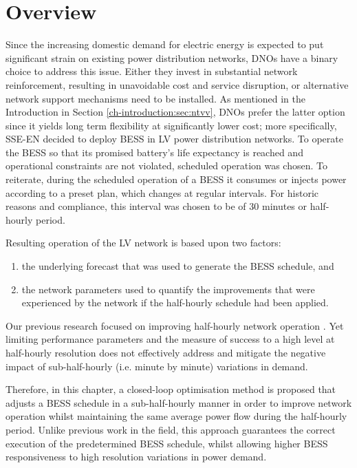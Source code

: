 \section{Overview}
\label{ch1:sec:overview}

Since the increasing domestic demand for electric energy is expected to put significant strain on existing power distribution networks, DNOs have a binary choice to address this issue.
Either they invest in substantial network reinforcement, resulting in unavoidable cost and service disruption, or alternative network support mechanisms need to be installed.
As mentioned in the Introduction in Section \ref{ch-introduction:sec:ntvv}, DNOs prefer the latter option since it yields long term flexibility at significantly lower cost; more specifically, SSE-EN decided to deploy BESS in LV power distribution networks.
To operate the BESS so that its promised battery's life expectancy is reached and operational constraints are not violated, scheduled operation was chosen.
To reiterate, during the scheduled operation of a BESS it consumes or injects power according to a preset plan, which changes at regular intervals.
For historic reasons and compliance, this interval was chosen to be of 30 minutes or half-hourly period.

Resulting operation of the LV network is based upon two factors:

\begin{enumerate}
	\item the underlying forecast that was used to generate the BESS schedule, and
	\item the network parameters used to quantify the improvements that were experienced by the network if the half-hourly schedule had been applied.
\end{enumerate}

Our previous research focused on improving half-hourly network operation \cite{Rowe2014a, Yunusov2011}.
Yet limiting performance parameters and the measure of success to a high level at half-hourly resolution does not effectively address and mitigate the negative impact of sub-half-hourly (i.e. minute by minute) variations in demand.

Therefore, in this chapter, a closed-loop optimisation method is proposed that adjusts a BESS schedule in a sub-half-hourly manner in order to improve network operation whilst maintaining the same average power flow during the half-hourly period.
Unlike previous work in the field, this approach guarantees the correct execution of the predetermined BESS schedule, whilst allowing higher BESS responsiveness to high resolution variations in power demand.

